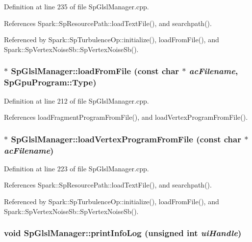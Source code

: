 Definition at line 235 of file Sp\-Glsl\-Manager.cpp.

References Spark::Sp\-Resource\-Path::load\-Text\-File(), and searchpath().

Referenced by Spark::Sp\-Turbulence\-Op::initialize(), load\-From\-File(), and Spark::Sp\-Vertex\-Noise\-Sb::Sp\-Vertex\-Noise\-Sb().
\subsubsection{ $\ast$ Sp\-Glsl\-Manager::load\-From\-File (const char $\ast$ {\em ac\-Filename}, {\bf Sp\-Gpu\-Program::Type})\hspace{0.3cm}{\tt  [static]}}\label{classSpark_1_1SpGlslManager_e6}


Definition at line 212 of file Sp\-Glsl\-Manager.cpp.

References load\-Fragment\-Program\-From\-File(), and load\-Vertex\-Program\-From\-File().
\subsubsection{ $\ast$ Sp\-Glsl\-Manager::load\-Vertex\-Program\-From\-File (const char $\ast$ {\em ac\-Filename})\hspace{0.3cm}{\tt  [static]}}\label{classSpark_1_1SpGlslManager_e7}


Definition at line 223 of file Sp\-Glsl\-Manager.cpp.

References Spark::Sp\-Resource\-Path::load\-Text\-File(), and searchpath().

Referenced by Spark::Sp\-Turbulence\-Op::initialize(), load\-From\-File(), and Spark::Sp\-Vertex\-Noise\-Sb::Sp\-Vertex\-Noise\-Sb().
\subsubsection{\setlength{\rightskip}{0pt plus 5cm}void Sp\-Glsl\-Manager::print\-Info\-Log (unsigned int {\em ui\-Handle})\hspace{0.3cm}{\tt  [static]}}\label{classSpark_1_1SpGlslManager_e9}


